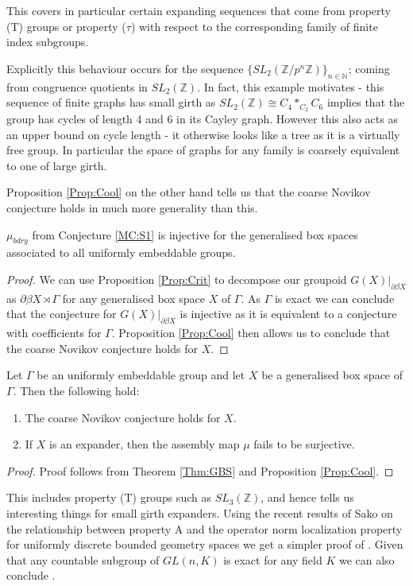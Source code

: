 This covers in particular certain expanding sequences that come from property (T) groups or property ($\tau$) with respect to the corresponding family of finite index subgroups. 

Explicitly this behaviour occurs for the sequence $\lbrace SL_{2}(\mathbb{Z}/p^{n}\mathbb{Z})\rbrace_{n\in\mathbb{N}}$; coming from congruence quotients in $SL_{2}(\mathbb{Z})$. In fact, this example motivates \cite{MR2568691} - this sequence of finite graphs has small girth as $SL_{2}(\mathbb{Z}) \cong C_{4}\ast_{C_{2}}C_{6}$ implies that the group has cycles of length 4 and 6 in its Cayley graph. However this also acts as an upper bound on cycle length - it otherwise looks like a tree as it is a virtually free group. In particular the space of graphs for any family is coarsely equivalent to one of large girth. 

Proposition \ref{Prop:Cool} on the other hand tells us that the coarse Novikov conjecture holds in much more generality than this. 

\begin{theorem}\label{Thm:GBS}
$\mu_{bdry}$ from Conjecture \ref{MC:S1} is injective for the generalised box spaces associated to all uniformly embeddable groups.
\end{theorem}
\begin{proof}
We can use Proposition \ref{Prop:Crit} to decompose our groupoid $G(X)|_{\partial \beta X}$ as $\partial\beta X \rtimes \Gamma$ for any generalised box space $X$ of $\Gamma$. As $\Gamma$ is exact we can conclude that the conjecture for $G(X)|_{\partial \beta X}$ is injective as it is equivalent to a conjecture with coefficients for $\Gamma$. Proposition \ref{Prop:Cool} then allows us to conclude that the coarse Novikov conjecture holds for $X$.
\end{proof}

\begin{corollary}
Let $\Gamma$ be an uniformly embeddable group and let $X$ be a generalised box space of $\Gamma$. Then the following hold:
\begin{enumerate}
\item The coarse Novikov conjecture holds for $X$.
\item If $X$ is an expander, then the assembly map $\mu$ fails to be surjective.
\end{enumerate}
\end{corollary}
\begin{proof}
Proof follows from Theorem \ref{Thm:GBS} and Proposition \ref{Prop:Cool}.
\end{proof}
This includes property (T) groups such as $SL_{3}(\mathbb{Z})$, and hence tells us interesting things for small girth expanders. Using the recent results of Sako on the relationship between property A and the operator norm localization property for uniformly discrete bounded geometry spaces \cite{AONL-2012} we get a simpler proof of \cite[Theorem 7.1]{MR2419930}. Given that any countable subgroup of $GL(n,K)$ is exact for any field $K$ \cite{MR2217050} we can also conclude \cite[Theorem 5.3]{MR2764895}.

